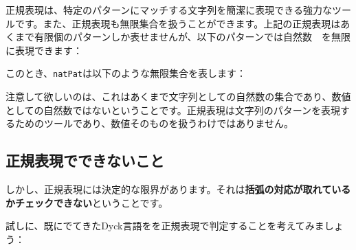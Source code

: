 正規表現は、特定のパターンにマッチする文字列を簡潔に表現できる強力なツールです。また、正規表現も無限集合を扱うことができます。上記の正規表現はあくまで有限個のパターンしか表せませんが、以下のパターンでは自然数　を無限に表現できます：

\begin{Shaded}
\begin{Highlighting}[]
\NormalTok{;  }
\NormalTok{\}}
\end{Highlighting}
\end{Shaded}

このとき、\texttt{natPat}は以下のような無限集合を表します：

\begin{Shaded}
\begin{Highlighting}[]
\end{Highlighting}
\end{Shaded}

注意して欲しいのは、これはあくまで文字列としての自然数の集合であり、数値としての自然数ではないということです。正規表現は文字列のパターンを表現するためのツールであり、数値そのものを扱うわけではありません。

\hypertarget{chapter4-ux6b63ux898fux8868ux73feux3067ux3067ux304dux306aux3044ux3053ux3068}{%
\subsection{正規表現でできないこと}\label{chapter4-ux6b63ux898fux8868ux73feux3067ux3067ux304dux306aux3044ux3053ux3068}}

しかし、正規表現には決定的な限界があります。それは\textbf{括弧の対応が取れているかチェックできない}ということです。

試しに、既にでてきたDyck言語をを正規表現で判定することを考えてみましょう：

\begin{Shaded}
\begin{Highlighting}[]
\end{Highlighting}
\end{Shaded}

